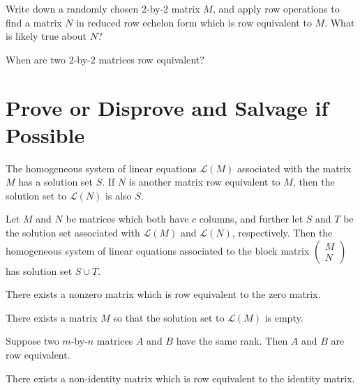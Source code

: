 \documentclass{homework}
\begin{document}
\begin{problem}
  Write down a randomly chosen $2$-by-$2$ matrix $M$, and apply row
  operations to find a matrix $N$ in reduced row echelon form which is row
  equivalent to $M$.  What is likely true about $N$?
\end{problem}

\begin{problem}
  When are two $2$-by-$2$ matrices row equivalent?
\end{problem}

\section{Prove or Disprove and Salvage if Possible}

\begin{problem}
  The homogeneous system of linear equations $\mathcal{L}(M)$
  associated with the matrix $M$ has a solution set $S$.  If $N$ is
  another matrix row equivalent to $M$, then the solution set to
  $\mathcal{L}(N)$ is also $S$.
\end{problem}

\begin{problem}
  Let $M$ and $N$ be matrices which both have $c$ columns, and further
  let $S$ and $T$ be the solution set associated with $\mathcal{L}(M)$
  and $\mathcal{L}(N)$, respectively.  Then the homogeneous system of
  linear equations associated to the block matrix $\begin{pmatrix} M \\
    N \end{pmatrix}$ has solution set $S \cup T$.
\end{problem}

\begin{problem}
  There exists a nonzero matrix which is row equivalent to the zero matrix.
\end{problem}

\begin{problem}
  There exists a matrix $M$ so that the solution set to $\mathcal{L}(M)$ is empty.
\end{problem}

\begin{problem}
  Suppose two $m$-by-$n$ matrices $A$ and $B$ have the same rank.
  Then $A$ and $B$ are row equivalent.
\end{problem}

\begin{problem}
  There exists a non-identity matrix which is row equivalent to the identity
  matrix.
\end{problem}
\end{document}
